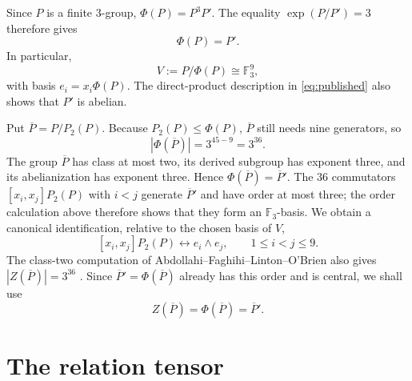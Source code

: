\documentclass[10pt,a4paper]{amsart}
\newcommand{\F}{\mathbb F}
\begin{document}
Since $P$ is a finite $3$-group,
$\Phi(P)=P^3P'$.  The equality $\exp(P/P')=3$ therefore gives
\begin{equation}\label{eq:phi}
                              \Phi(P)=P'.
\end{equation}
In particular,
\[
                       V:=P/\Phi(P)\cong\F_3^9,
\]
with basis $e_i=x_i\Phi(P)$.  The direct-product description in
\eqref{eq:published} also shows that $P'$ is abelian.

Put $\overline P=P/P_2(P)$.  Because $P_2(P)\leq\Phi(P)$,
$\overline P$ still needs nine generators, so
\[
 |\Phi(\overline P)|=3^{45-9}=3^{36}.
\]
The group $\overline P$ has class at most two, its derived subgroup has
exponent three, and its abelianization has exponent three.  Hence
$\Phi(\overline P)=\overline P'$.  The $36$ commutators
$[x_i,x_j]P_2(P)$ with $i<j$ generate $\overline P'$ and have order at
most three; the order calculation above therefore shows that they form an
$\F_3$-basis.  We obtain a canonical identification, relative to the
chosen basis of $V$,
\begin{equation}\label{eq:wedge-id}
 [x_i,x_j]P_2(P)\longleftrightarrow e_i\wedge e_j,
 \qquad 1\le i<j\le9.
\end{equation}
The class-two computation of Abdollahi--Faghihi--Linton--O'Brien also gives
$|Z(\overline P)|=3^{36}$ \cite[Lemma~3.1 and p.~5]{AFLObrien10}.
Since $\overline P'=\Phi(\overline P)$ already has this order and is
central, we shall use
\begin{equation}\label{eq:centerbar}
 Z(\overline P)=\Phi(\overline P)=\overline P'.
\end{equation}

\section{The relation tensor}\label{sec:tensor}
\end{document}
